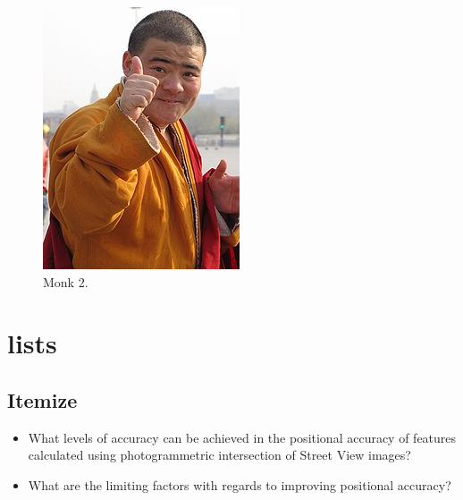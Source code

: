 \begin{figure}[H]
\begin{minipage}[b]{0.45\textwidth}
    \includegraphics[width=\textwidth]{Figures/yeh_monk.jpg}
    \caption[Monk2]{Monk 2.}
  \end{minipage}
\end{figure}

\section{lists}

\subsection{Itemize}
\begin{itemize}
\item What levels of accuracy can be achieved in the positional accuracy of features calculated using photogrammetric intersection of Street View images?
\item What are the limiting factors with regards to improving positional accuracy?
\end{itemize}

